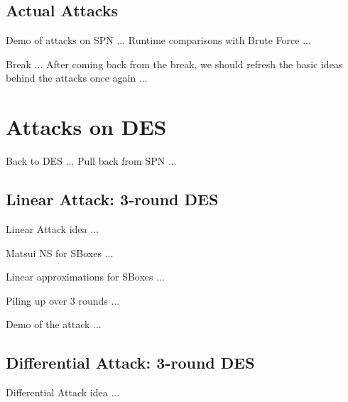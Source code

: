\documentclass[9pt]{beamer}
\begin{document}
\subsection{Actual Attacks}
\begin{frame}
Demo of attacks on SPN ... Runtime comparisons with Brute Force ...

\end{frame}

\begin{frame}
Break ... After coming back from the break, we should refresh the basic ideas behind the attacks once again ...

\end{frame}


\section{Attacks on DES}
\begin{frame}
Back to DES ... Pull back from SPN ...

\end{frame}

\subsection{Linear Attack: 3-round DES}
\begin{frame}
Linear Attack idea ... 

\end{frame}

\begin{frame}
Matsui NS for SBoxes ...

\end{frame}

\begin{frame}
Linear approximations for SBoxes ...

\end{frame}

\begin{frame}
Piling up over 3 rounds ...

\end{frame}

\begin{frame}
Demo of the attack ...

\end{frame}

\subsection{Differential Attack: 3-round DES}
\begin{frame}
Differential Attack idea ... 

\end{frame}
\end{document}
